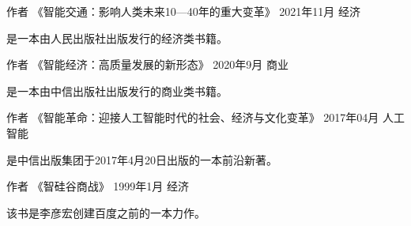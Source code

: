 

\begin{cventries}

  \cventry
    {作者} %
    {《智能交通：影响人类未来10—40年的重大变革》} %
    {2021年11月} %
    {经济}
    {
      \begin{cvitems} %
        \item {是一本由人民出版社出版发行的经济类书籍。}
      \end{cvitems}
    }

  \cventry
    {作者} %
    {《智能经济：高质量发展的新形态》} %
    {2020年9月} %
    {商业}
    {
      \begin{cvitems} %
        \item {是一本由中信出版社出版发行的商业类书籍。}
      \end{cvitems}
    }

  \cventry
    {作者} %
    {《智能革命：迎接人工智能时代的社会、经济与文化变革》} %
    {2017年04月} %
    {人工智能}
    {
      \begin{cvitems} %
        \item {是中信出版集团于2017年4月20日出版的一本前沿新著。}
      \end{cvitems}
    }


  \cventry
    {作者} %
    {《智硅谷商战》} %
    {1999年1月} %
    {经济}
    {
      \begin{cvitems} %
        \item {该书是李彦宏创建百度之前的一本力作。}
      \end{cvitems}
    }

\end{cventries}
